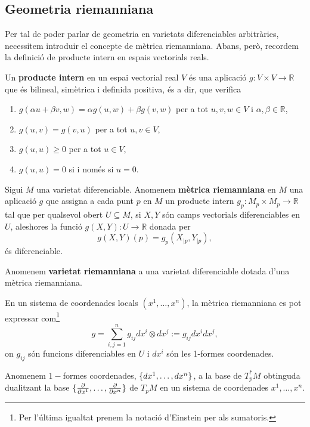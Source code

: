 \subsection{Geometria riemanniana}
Per tal de poder parlar de geometria en varietats diferenciables arbitràries, necessitem introduir el concepte de mètrica riemanniana. Abans, però, recordem la definició de producte intern en espais vectorials reals.
\begin{defi}
    Un \textbf{producte intern} en un espai vectorial real $V$ és una aplicació $g:V\times V\to\mathbb R$ que és bilineal, simètrica i definida positiva, és a dir, que verifica
    \begin{enumerate}
        \item $g(\alpha u + \beta v, w) = \alpha g(u,w) + \beta g(v,w)$ per a tot $u,v,w\in V$ i $\alpha,\beta\in\mathbb R$,
        \item $g(u,v) = g(v,u)$ per a tot $u,v\in V$,
        \item $g(u,u)\ge0$ per a tot $u\in V$,
        \item $g(u,u) = 0$ si i només si $u = 0$.
    \end{enumerate}
\end{defi}

\begin{defi}
    Sigui $M$ una varietat diferenciable. Anomenem \textbf{mètrica riemanniana} en $M$ una aplicació $g$ que assigna a cada punt $p$ en $M$ un producte intern $g_p:M_p\times M_p\to\mathbb R$ tal que per qualsevol obert $U\subseteq M$, si $X,Y$ són camps vectorials diferenciables en $U$, aleshores la funció $g(X,Y):U\to\mathbb R$ donada per
    \begin{equation*}
        g(X,Y)(p) = g_p(X_{|p},Y_{|p}),
    \end{equation*}
    és diferenciable.
    
    Anomenem \textbf{varietat riemanniana} a una varietat diferenciable dotada d'una mètrica riemanniana.
\end{defi}
En un sistema de coordenades locals $(x^1,\dots,x^n)$, la mètrica riemanniana es pot expressar com\footnote{Per l'última igualtat prenem la notació d'Einstein per als sumatoris.}
\begin{equation*}
    g = \sum_{i,j=1}^n g_{ij}dx^i\otimes dx^j := g_{ij}dx^idx^j,
\end{equation*}
on $g_{ij}$ són funcions diferenciables en $U$ i $dx^i$ són les 1-formes coordenades.

\begin{defi}
    Anomenem $1-$formes coordenades, $\{dx^1,\dots,dx^n\}$, a la base de $T_p^*M$ obtinguda dualitzant la base $\{\frac{\partial}{\partial x^1},\dots,\frac{\partial}{\partial x^n}\}$ de $T_pM$ en un sistema de coordenades $x^1,\dots,x^n$.
\end{defi}

